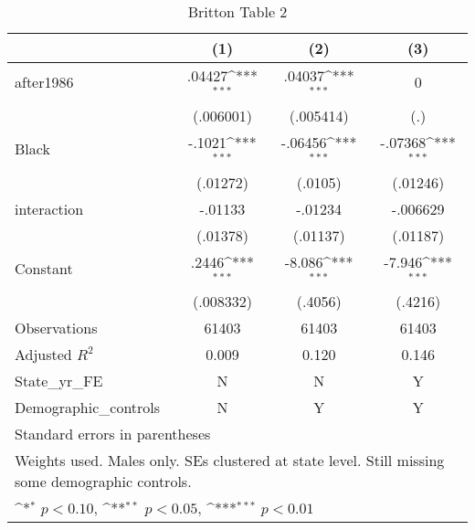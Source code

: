 \begin{table}[htbp]\centering
\def\sym#1{\ifmmode^{#1}\else\(^{#1}\)\fi}
\caption{Britton Table 2}
\begin{tabular}{l*{3}{c}}
\hline\hline
                    &\multicolumn{1}{c}{(1)}         &\multicolumn{1}{c}{(2)}         &\multicolumn{1}{c}{(3)}         \\
\hline
after1986           &      .04427\sym{***}&      .04037\sym{***}&           0         \\
                    &   (.006001)         &   (.005414)         &         (.)         \\
[1em]
Black               &      -.1021\sym{***}&     -.06456\sym{***}&     -.07368\sym{***}\\
                    &    (.01272)         &     (.0105)         &    (.01246)         \\
[1em]
interaction         &     -.01133         &     -.01234         &    -.006629         \\
                    &    (.01378)         &    (.01137)         &    (.01187)         \\
[1em]
Constant            &       .2446\sym{***}&      -8.086\sym{***}&      -7.946\sym{***}\\
                    &   (.008332)         &     (.4056)         &     (.4216)         \\
\hline
Observations        &       61403         &       61403         &       61403         \\
Adjusted \(R^{2}\)  &       0.009         &       0.120         &       0.146         \\
State\_yr\_FE         &           N         &           N         &           Y         \\
Demographic\_controls&           N         &           Y         &           Y         \\
\hline\hline
\multicolumn{4}{l}{\footnotesize Standard errors in parentheses}\\
\multicolumn{4}{l}{\footnotesize Weights used. Males only. SEs clustered at state level. Still missing some demographic controls.}\\
\multicolumn{4}{l}{\footnotesize \sym{*} \(p<0.10\), \sym{**} \(p<0.05\), \sym{***} \(p<0.01\)}\\
\end{tabular}
\end{table}
